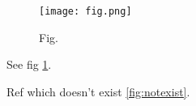 \documentclass{article}
\begin{document}
  \begin{figure}[h]
    \texttt{[image: fig.png]}
    \caption{Fig.}
    \label{fig:fig}
  \end{figure}
  See fig \ref{fig:fig}.

  Ref which doesn't exist \ref{fig:notexist}.
\end{document}
